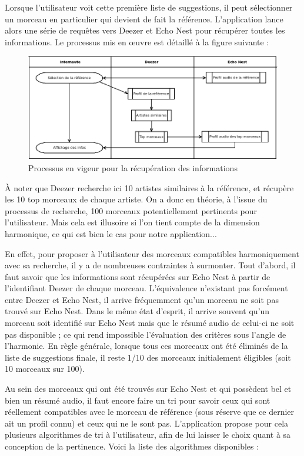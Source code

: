 \documentclass[a4paper,12pt]{article}
\begin{document}
Lorsque l'utilisateur voit cette première liste de suggestions, il peut sélectionner un morceau en particulier qui devient de fait la référence. L'application lance alors une série de requêtes vers Deezer et Echo Nest pour récupérer toutes les informations. Le processus mis en œuvre est détaillé à la figure suivante :

\begin{figure}[!h]
  \begin{center}
    \includegraphics[scale=0.4]{processus.png}
    \caption{Processus en vigeur pour la récupération des informations}
  \end{center}
\end{figure}

À noter que Deezer recherche ici 10 artistes similaires à la référence, et récupère les 10 top morceaux de chaque artiste. On a donc en théorie, à l'issue du processus de recherche, 100 morceaux potentiellement pertinents pour l'utilisateur. Mais cela est illusoire si l'on tient compte de la dimension harmonique, ce qui est bien le cas pour notre application...

En effet, pour proposer à l'utilisateur des morceaux compatibles harmoniquement avec sa recherche, il y a de nombreuses contraintes à surmonter. Tout d'abord, il faut savoir que les informations sont récupérées sur Echo Nest à partir de l'identifiant Deezer de chaque morceau. L'équivalence n'existant pas forcément entre Deezer et Echo Nest, il arrive fréquemment qu'un morceau ne soit pas trouvé sur Echo Nest. Dans le même état d'esprit, il arrive souvent qu'un morceau soit identifié sur Echo Nest mais que le résumé audio de celui-ci ne soit pas disponible ; ce qui rend impossible l'évaluation des critères sous l'angle de l'harmonie. En règle générale, lorsque tous ces morceaux ont été éliminés de la liste de suggestions finale, il reste 1/10 des morceaux initialement éligibles (soit 10 morceaux sur 100).

Au sein des morceaux qui ont été trouvés sur Echo Nest et qui possèdent bel et bien un résumé audio, il faut encore faire un tri pour savoir ceux qui sont réellement compatibles avec le morceau de référence (sous réserve que ce dernier ait un profil connu) et ceux qui ne le sont pas. L'application propose pour cela plusieurs algorithmes de tri à l'utilisateur, afin de lui laisser le choix quant à sa conception de la pertinence. Voici la liste des algorithmes disponibles :
\end{document}
